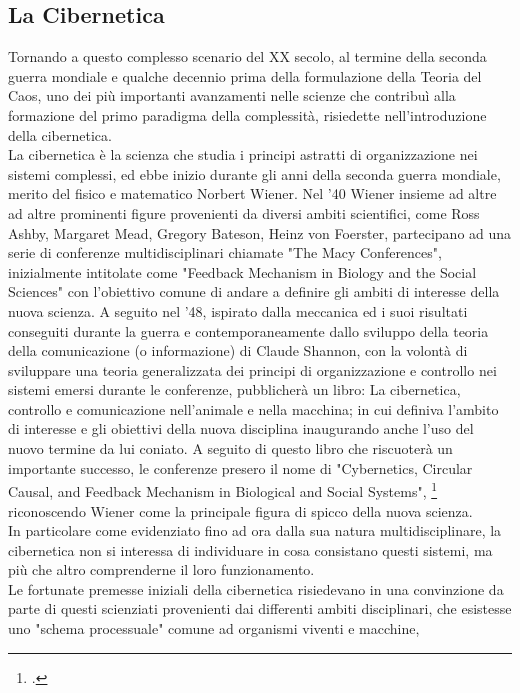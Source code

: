 \subsection{La Cibernetica}
\label{sec:La Cibernetica}
Tornando a questo complesso scenario del XX secolo,
al termine della seconda guerra mondiale e
qualche decennio prima della formulazione della Teoria del Caos,
uno dei più importanti avanzamenti nelle scienze che contribuì alla
formazione del primo paradigma della complessità,
risiedette nell'introduzione della cibernetica. \\
La cibernetica è la scienza che studia i principi astratti di organizzazione
nei sistemi complessi, ed ebbe inizio durante gli anni della seconda guerra
mondiale, merito del fisico e matematico Norbert Wiener.
Nel '40 Wiener insieme ad altre ad altre prominenti figure provenienti
da diversi ambiti scientifici,
come Ross Ashby, Margaret Mead, Gregory Bateson, Heinz von Foerster,
partecipano ad una serie di conferenze
multidisciplinari chiamate "The Macy Conferences", inizialmente intitolate come
"Feedback Mechanism in Biology and the Social Sciences"
con l'obiettivo comune di andare a definire
gli ambiti di interesse della nuova scienza.
A seguito nel '48,
ispirato dalla meccanica ed i suoi risultati conseguiti durante la guerra
e contemporaneamente dallo sviluppo della teoria della comunicazione
(o informazione) di Claude Shannon,
con la volontà di sviluppare una teoria generalizzata dei principi di
organizzazione e controllo nei sistemi emersi durante le conferenze,
pubblicherà un libro:
La cibernetica, controllo e comunicazione nell'animale e nella macchina;
in cui definiva l'ambito di interesse e gli obiettivi della nuova disciplina
inaugurando anche l'uso del nuovo termine da lui coniato.
A seguito di questo libro che riscuoterà
un importante successo, le conferenze presero il nome di
"Cybernetics, Circular Causal, and Feedback Mechanism
in Biological and Social Systems", \footcite{fabbrisgiustinianocyb}
riconoscendo Wiener come la principale figura di spicco della nuova scienza. \\
In particolare come evidenziato fino ad ora dalla sua natura multidisciplinare,
la cibernetica non si interessa di individuare in
cosa consistano questi sistemi,
ma più che altro comprenderne il loro funzionamento. \\
Le fortunate premesse iniziali della cibernetica risiedevano in una convinzione
da parte di questi scienziati provenienti dai differenti ambiti disciplinari,
che esistesse uno "schema processuale" comune ad organismi viventi e macchine,
